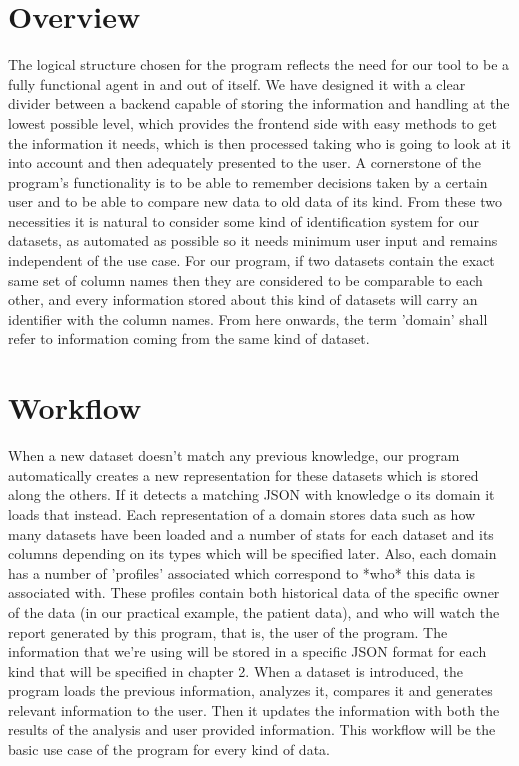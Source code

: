 \section{Overview}
\label{cap1:sec:overview}

The logical structure chosen for the program reflects the need for our tool to be a fully functional agent in and out of itself. We have designed it with a clear divider between a backend capable of storing the information and handling at the lowest possible level, which provides the frontend side with easy methods to get the information it needs, which is then processed taking who is going to look at it into account and then adequately presented to the user.
A cornerstone of the program's functionality is to be able to remember decisions taken by a certain user and to be able to compare new data to old data of its kind.
From these two necessities it is natural to consider some kind of identification system for our datasets, as automated as possible so it needs minimum user input and remains independent of the use case.
For our program, if two datasets contain the exact same set of column names then they are considered to be comparable to each other, and every information stored about this kind of datasets will carry an identifier with the column names.
From here onwards, the term 'domain' shall refer to information coming from the same kind of dataset.

\section{Workflow}
\label{cap1:sec:workflow}

When a new dataset doesn't match any previous knowledge, our program automatically creates a new representation for these datasets which is stored along the others. If it detects a matching JSON with knowledge o its domain it loads that instead.
Each representation of a domain stores data such as how many datasets have been loaded and a number of stats for each dataset and its columns depending on its types which will be specified later.
Also, each domain has a number of 'profiles' associated which correspond to *who* this data is associated with. These profiles contain both historical data of the specific owner of the data (in our practical example, the patient data), and who will watch the report generated by this program, that is, the user of the program.
The information that we're using will be stored in a specific JSON format for each kind that will be specified in chapter 2.
When a dataset is introduced, the program loads the previous information, analyzes it, compares it and generates relevant information to the user. Then it updates the information with both the results of the analysis and user provided information.
This workflow will be the basic use case of the program for every kind of data.

